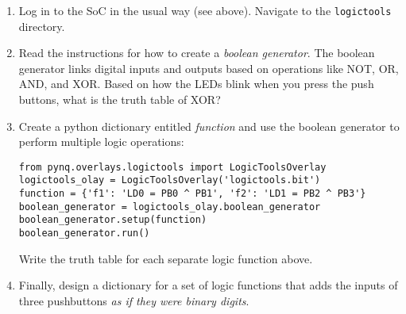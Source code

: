 \documentclass{article}
\begin{document}
\begin{enumerate}
\item Log in to the SoC in the usual way (see above).  Navigate to the \verb+logictools+ directory.
\item Read the instructions for how to create a \textit{boolean generator}.  The boolean generator links digital inputs and outputs based on operations like NOT, OR, AND, and XOR.  Based on how the LEDs blink when you press the push buttons, what is the truth table of XOR? \\ \vspace{2cm}
\item Create a python dictionary entitled \textit{function} and use the boolean generator to perform multiple logic operations:
\begin{verbatim}
from pynq.overlays.logictools import LogicToolsOverlay
logictools_olay = LogicToolsOverlay('logictools.bit')
function = {'f1': 'LD0 = PB0 ^ PB1', 'f2': 'LD1 = PB2 ^ PB3'}
boolean_generator = logictools_olay.boolean_generator
boolean_generator.setup(function)
boolean_generator.run()
\end{verbatim}
Write the truth table for each separate logic function above. \\ \vspace{0.5cm}
\item Finally, design a dictionary for a set of logic functions that adds the inputs of three pushbuttons \textit{as if they were binary digits}.
\end{enumerate}
\end{document}
